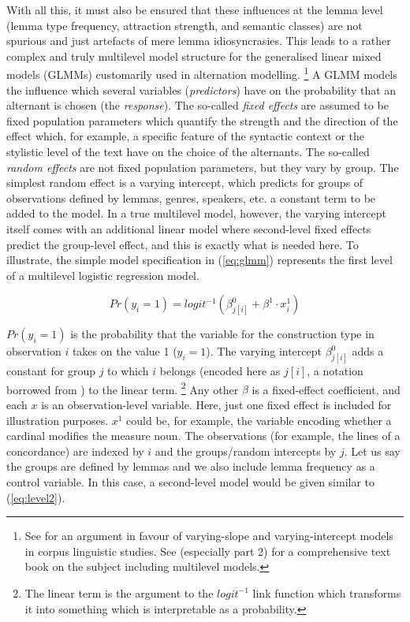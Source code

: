 With all this, it must also be ensured that these influences at the lemma level (lemma type frequency, attraction strength, and semantic classes) are not spurious and just artefacts of mere lemma idiosyncrasies.
This leads to a rather complex and truly multilevel model structure for the generalised linear mixed models (GLMMs) customarily used in alternation modelling.%
\footnote{See \citet{Gries2015} for an argument in favour of varying-slope and varying-intercept models in corpus linguistic studies.
See \citet{GelmanHill2006} (especially part 2) for a comprehensive text book on the subject including multilevel models.}
A GLMM models the influence which several variables (\textit{predictors}) have on the probability that an alternant is chosen (the \textit{response}).
The so-called \textit{fixed effects} are assumed to be fixed population parameters which quantify the strength and the direction of the effect which, for example, a specific feature of the syntactic context or the stylistic level of the text have on the choice of the alternants.
The so-called \textit{random effects} are not fixed population parameters, but they vary by group.
The simplest random effect is a varying intercept, which predicts for groups of observations defined by lemmas, genres, speakers, etc. a constant term to be added to the model.
In a true multilevel model, however, the varying intercept itself comes with an additional linear model where second-level fixed effects predict the group-level effect, and this is exactly what is needed here.
To illustrate, the simple model specification in (\ref{eq:glmm}) represents the first level of a multilevel logistic regression model.

\begin{equation}
  Pr(y_i=1)=logit^{-1}(\beta^0_{j[i]}+\beta^1\cdot x^1_i)
  \label{eq:glmm}
\end{equation}

$Pr(y_i=1)$ is the probability that the variable for the construction type in observation $i$ takes on the value 1 ($y_i=1$).
The varying intercept $\beta^0_{j[i]}$ adds a constant for group $j$ to which $i$ belongs (encoded here as $j[i]$, a notation borrowed from \citealp{GelmanHill2006}) to the linear term.%
\footnote{The linear term is the argument to the $logit^{-1}$ link function which transforms it into something which is interpretable as a probability.}
Any other $\beta$ is a fixed-effect coefficient, and each $x$ is an observation-level variable.
Here, just one fixed effect is included for illustration purposes.
$x^1$ could be, for example, the variable encoding whether a cardinal modifies the measure noun.
The observations (for example, the lines of a concordance) are indexed by $i$ and the groups\slash random intercepts by $j$.
Let us say the groups are defined by lemmas and we also include lemma frequency as a control variable.
In this case, a second-level model would be given similar to (\ref{eq:level2}).


